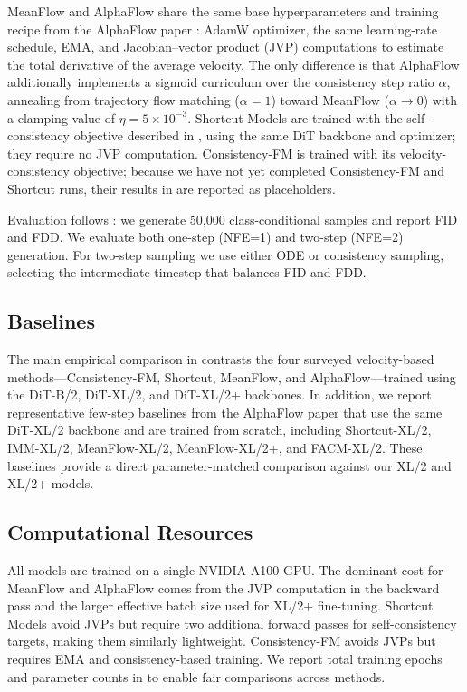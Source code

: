 MeanFlow and AlphaFlow share the same base hyperparameters and training recipe from the AlphaFlow paper \citep{zhang2025alphaflow}: AdamW optimizer, the same learning-rate schedule, EMA, and Jacobian--vector product (JVP) computations to estimate the total derivative of the average velocity. The only difference is that AlphaFlow additionally implements a sigmoid curriculum over the consistency step ratio $\alpha$, annealing from trajectory flow matching ($\alpha=1$) toward MeanFlow ($\alpha\to 0$) with a clamping value of $\eta=5\times 10^{-3}$. Shortcut Models are trained with the self-consistency objective described in , using the same DiT backbone and optimizer; they require no JVP computation. Consistency-FM is trained with its velocity-consistency objective; because we have not yet completed Consistency-FM and Shortcut runs, their results in  are reported as placeholders.

Evaluation follows \citet{zhang2025alphaflow}: we generate 50,000 class-conditional samples and report FID and FDD. We evaluate both one-step (NFE=1) and two-step (NFE=2) generation. For two-step sampling we use either ODE or consistency sampling, selecting the intermediate timestep that balances FID and FDD.

\subsection{Baselines}

The main empirical comparison in  contrasts the four surveyed velocity-based methods---Consistency-FM, Shortcut, MeanFlow, and AlphaFlow---trained using the DiT-B/2, DiT-XL/2, and DiT-XL/2+ backbones. In addition, we report representative few-step baselines from the AlphaFlow paper that use the same DiT-XL/2 backbone and are trained from scratch, including Shortcut-XL/2, IMM-XL/2, MeanFlow-XL/2, MeanFlow-XL/2+, and FACM-XL/2. These baselines provide a direct parameter-matched comparison against our XL/2 and XL/2+ models.


\subsection{Computational Resources}

All models are trained on a single NVIDIA A100 GPU. The dominant cost for MeanFlow and AlphaFlow comes from the JVP computation in the backward pass and the larger effective batch size used for XL/2+ fine-tuning. Shortcut Models avoid JVPs but require two additional forward passes for self-consistency targets, making them similarly lightweight. Consistency-FM avoids JVPs but requires EMA and consistency-based training. We report total training epochs and parameter counts in  to enable fair comparisons across methods.
